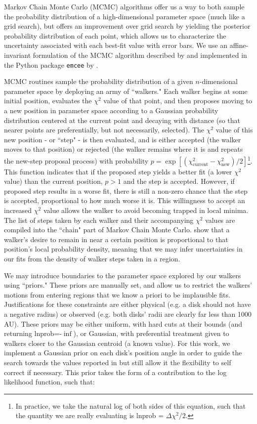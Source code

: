 Markov Chain Monte Carlo (MCMC) algorithms offer us a way to both sample the probability distribution of a high-dimensional parameter space (much like a grid search), but offers an improvement over grid search by yielding the posterior probability distribution of each point, which allows us to characterize the uncertainty associated with each best-fit value with error bars. We use an affine-invariant formulation of the MCMC algorithm described by \citet{Goodman2010} and implemented in the Python package \texttt{emcee} by \citet{ForemanMackey2013}.

MCMC routines sample the probability distribution of a given $n$-dimensional parameter space by deploying an army of ``walkers." Each walker begins at some initial position, evaluates the $\chi^2$ value of that point, and then proposes moving to a new position in parameter space according to a Gaussian probability distribution centered at the current point and decaying with distance (so that nearer points are preferentially, but not necessarily, selected). The $\chi^2$ value of this new position - or ``step" - is then evaluated, and is either accepted (the walker moves to that position) or rejected (the walker remains where it is and repeats the new-step proposal process) with probability $p = \exp \left[ (\chi_\text{current}^2 - \chi_\text{new}^2)/2 \right]$\footnote{In practice, we take the natural log of both sides of this equation, such that the quantity we are really evaluating is lnprob = $\Delta \chi^2/2$.}. This function indicates that if the proposed step yields a better fit (a lower $\chi^2$ value) than the current position, $p > 1$ and the step is accepted. However, if proposed step results in a worse fit, there is still a non-zero chance that the step is accepted, proportional to how much worse it is. This willingness to accept an increased $\chi^2$ value allows the walker to avoid becoming trapped in local minima. The list of steps taken by each walker and their accompanying $\chi^2$ values are compiled into the ``chain" part of Markov Chain Monte Carlo. \citet{Goodman2010} show that a walker's desire to remain in near a certain position is proportional to that position's local probability density, meaning that we may infer uncertainties in our fits from the density of walker steps taken in a region.

We may introduce boundaries to the parameter space explored by our walkers using ``priors." These priors are manually set, and allow us to restrict the walkers' motions from entering regions that we know a priori to be implausible fits. Justifications for these constraints are either physical (e.g. a disk should not have a negative radius) or observed (e.g. both disks' radii are clearly far less than 1000 AU). These priors may be either uniform, with hard cuts at their bounds (and returning lnprob=-$\inf$), or Gaussian, with preferential treatment given to walkers closer to the Gaussian centroid (a known value). For this work, we implement a Gaussian prior on each disk's position angle in order to guide the search towards the values reported in \citet{Williams2014} but still allow it the flexibility to self correct if necessary. This prior takes the form of a contribution to the log likelihood function, such that:


